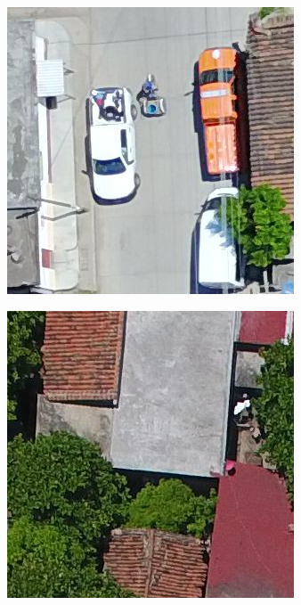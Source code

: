 \begin{figure}[!h]
\begin{subfigure}{.24\textwidth}
    \end{subfigure}
    \begin{subfigure}{.24\textwidth}
        \includegraphics[width=\textwidth]{images/nondamaged5.jpg}
    \end{subfigure}
    \begin{subfigure}{.24\textwidth}
        \includegraphics[width=\textwidth]{images/nondamaged6.jpg}

\end{subfigure}
\end{figure}
